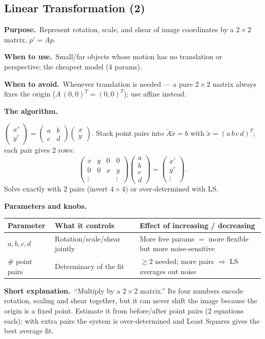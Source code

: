 \documentclass[10pt]{article}
\makeatletter
\newcommand{\Purpose}{\par\smallskip\textbf{Purpose.}\ }
\newcommand{\WhenUse}{\par\textbf{When to use.}\ }
\newcommand{\WhenAvoid}{\par\textbf{When to avoid.}\ }
\newcommand{\TheAlgo}{\par\smallskip\textbf{The algorithm.}\par\nopagebreak}
\newcommand{\Knobs}{\par\smallskip\textbf{Parameters and knobs.}\par\nopagebreak}
\newcommand{\ShortExp}{\par\smallskip\textbf{Short explanation.}\ }
\newenvironment{ptable}{\begin{center}\small\begin{tabular}{@{}p{2.5cm} p{5.9cm} p{6.2cm}@{}}\toprule
Parameter & What it controls & Effect of increasing / decreasing \\ \midrule}
{\bottomrule\end{tabular}\end{center}}
\makeatother
\begin{document}
\subsection{Linear Transformation (2)}
\Purpose Represent rotation, scale, and shear of image coordinates by a $2\times2$ matrix, $p'=Ap$.
\WhenUse Small/far objects whose motion has no translation or perspective; the cheapest model (4 params).
\WhenAvoid Whenever translation is needed --- a pure $2\times2$ matrix always fixes the origin
($A\,(0,0)^T=(0,0)^T$); use affine instead.
\TheAlgo
$\begin{pmatrix}x'\\y'\end{pmatrix}=\begin{pmatrix}a&b\\c&d\end{pmatrix}\begin{pmatrix}x\\y\end{pmatrix}$.
Stack point pairs into $\tilde A\tilde x=b$ with $\tilde x=(a\,b\,c\,d)^T$; each pair gives 2 rows:
\[
\begin{pmatrix} x & y & 0 & 0\\ 0 & 0 & x & y\\ \vdots&&&\vdots\end{pmatrix}
\begin{pmatrix}a\\b\\c\\d\end{pmatrix}=\begin{pmatrix}x'\\y'\\\vdots\end{pmatrix}.
\]
Solve exactly with 2 pairs (invert $4\times4$) or over-determined with LS.
\Knobs
\begin{ptable}
$a,b,c,d$ & Rotation/scale/shear jointly & More free params $=$ more flexible but more noise-sensitive \\
\# point pairs & Determinacy of the fit & $\geq2$ needed; more pairs $\Rightarrow$ LS averages out noise \\
\end{ptable}
\ShortExp ``Multiply by a $2\times2$ matrix.'' Its four numbers encode rotation, scaling and shear
together, but it can never shift the image because the origin is a fixed point. Estimate it from
before/after point pairs (2 equations each); with extra pairs the system is over-determined and Least
Squares gives the best average fit.
\end{document}
